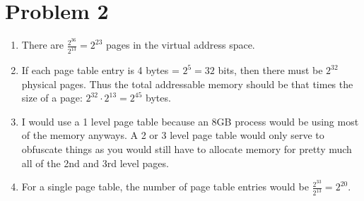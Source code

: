 \documentclass{article}
\begin{document}
\section*{Problem 2}
\begin{enumerate}[label=\alph*)]
\item There are $\frac{2^{36}}{2^{13}} = 2^{23}$ pages in the virtual address space. \\
\item If each page table entry is 4 bytes = $2^5 = 32$ bits, then there must be $2^{32}$ physical pages. Thus the total addressable memory should be that times the size of a page: $2^{32} \cdot 2^{13} = 2^{45}$ bytes. \\
\item I would use a 1 level page table because an 8GB process would be using most of the memory anyways. A 2 or 3 level page table would only serve to obfuscate things as you would still have to allocate memory for pretty much all of the 2nd and 3rd level pages. \\
\item For a single page table, the number of page table entries would be $\frac{2^33}{2^13} = 2^{20}$.
\end{enumerate}
\end{document}

